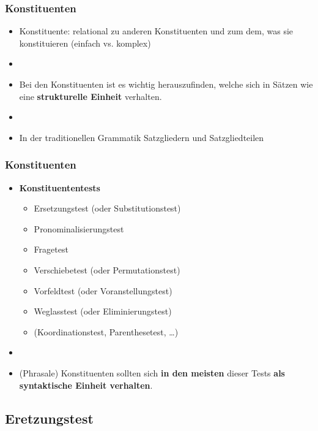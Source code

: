 \begin{frame}
\frametitle{Konstituenten}

\begin{itemize}
	\item Konstituente: relational zu anderen Konstituenten und zum dem, was sie konstituieren (\ras einfach vs. komplex)
	\item[]
	\item Bei den Konstituenten ist es wichtig herauszufinden, welche sich in Sätzen wie eine \textbf{strukturelle Einheit} verhalten.
	\item[]
	\item In der traditionellen Grammatik \ras Satzgliedern und Satzgliedteilen

\end{itemize}

\end{frame}


\begin{frame}
\frametitle{Konstituenten}

\begin{itemize}

	\item \textbf{Konstituententests} \citep[vgl.][]{MyP18a}
	\begin{itemize}
		\item Ersetzungstest (oder Substitutionstest)
		\item Pronominalisierungstest
		\item Fragetest
		\item Verschiebetest (oder Permutationstest)
		\item Vorfeldtest (oder Voranstellungstest) 
		\item Weglasstest (oder Eliminierungstest)
		\item (Koordinationstest, Parenthesetest, \dots )
	\end{itemize}
	\item[]
	\item (Phrasale) Konstituenten sollten sich \textbf{in den meisten} dieser Tests \textbf{als syntaktische Einheit verhalten}.

\end{itemize}

\end{frame}


\subsection{Eretzungstest}

